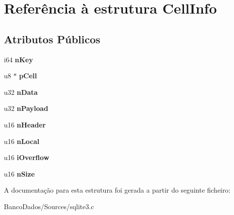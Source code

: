 \hypertarget{struct_cell_info}{\section{Referência à estrutura Cell\-Info}
\label{struct_cell_info}
}
\subsection*{Atributos Públicos}
\begin{DoxyCompactItemize}
\item 
\hypertarget{struct_cell_info_a542b041b9a54a13f7c6f2fe63e7542c0}{i64 {\bfseries n\-Key}}\label{struct_cell_info_a542b041b9a54a13f7c6f2fe63e7542c0}

\item 
\hypertarget{struct_cell_info_a595ed7eeb60ea274d868f24347b7238e}{u8 $\ast$ {\bfseries p\-Cell}}\label{struct_cell_info_a595ed7eeb60ea274d868f24347b7238e}

\item 
\hypertarget{struct_cell_info_af2301ed16c35633ec6b5d7792734a4bf}{u32 {\bfseries n\-Data}}\label{struct_cell_info_af2301ed16c35633ec6b5d7792734a4bf}

\item 
\hypertarget{struct_cell_info_ac1e3c1b4216a8e778bbac82907bb1485}{u32 {\bfseries n\-Payload}}\label{struct_cell_info_ac1e3c1b4216a8e778bbac82907bb1485}

\item 
\hypertarget{struct_cell_info_a99bb1f87208f793359cf63e3d164025b}{u16 {\bfseries n\-Header}}\label{struct_cell_info_a99bb1f87208f793359cf63e3d164025b}

\item 
\hypertarget{struct_cell_info_a8cedbcc2c94916fe5798b502c614bb08}{u16 {\bfseries n\-Local}}\label{struct_cell_info_a8cedbcc2c94916fe5798b502c614bb08}

\item 
\hypertarget{struct_cell_info_af7be0161f1c67600aeba783a68972f70}{u16 {\bfseries i\-Overflow}}\label{struct_cell_info_af7be0161f1c67600aeba783a68972f70}

\item 
\hypertarget{struct_cell_info_ace78ab5eb5337b686e31b895feeb0562}{u16 {\bfseries n\-Size}}\label{struct_cell_info_ace78ab5eb5337b686e31b895feeb0562}

\end{DoxyCompactItemize}


A documentação para esta estrutura foi gerada a partir do seguinte ficheiro\-:\begin{DoxyCompactItemize}
\item 
Banco\-Dados/\-Sources/sqlite3.\-c\end{DoxyCompactItemize}
